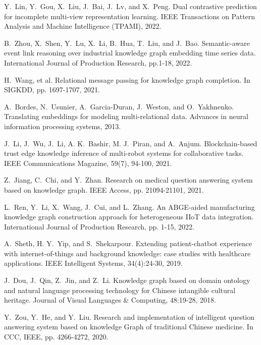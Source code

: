 \documentclass[11pt]{article}
\begin{document}
\begin{thebibliography}{10}
\begin{small}
 Y.~Lin, Y.~Gou, X.~Liu, J.~Bai, J.~Lv, and X.~Peng. \newblock Dual contrastive prediction for incomplete multi-view representation learning. \newblock IEEE Transactions on Pattern Analysis and Machine Intelligence (TPAMI), 2022.

 B.~Zhou, X.~Shen, Y.~Lu, X.~Li, B.~Hua, T.~Liu, and J.~Bao. \newblock  Semantic-aware event link reasoning over industrial knowledge graph embedding time series data. \newblock  International Journal of Production Research, pp.1-18, 2022.

 H.~Wang, et al. \newblock Relational message passing for knowledge graph completion. \newblock In SIGKDD, pp. 1697-1707, 2021.

 A.~Bordes, N.~Usunier, A.~Garcia-Duran, J.~Weston, and O.~Yakhnenko. \newblock Translating embeddings for modeling multi-relational data. \newblock Advances in neural information processing systems, 2013.

 J.~Li, J.~Wu, J.~Li, A. K.~Bashir, M. J.~Piran, and A.~Anjum. \newblock Blockchain-based trust edge knowledge inference of multi-robot systems for collaborative tasks. \newblock IEEE Communications Magazine, 59(7), 94-100, 2021.

 Z.~Jiang, C.~Chi, and Y.~Zhan. \newblock Research on medical question answering system based on knowledge graph. \newblock IEEE Access, pp. 21094-21101, 2021.

 L.~Ren, Y.~Li, X.~Wang, J.~Cui, and L.~Zhang. \newblock An ABGE-aided manufacturing knowledge graph construction approach for heterogeneous IIoT data integration. \newblock  International Journal of Production Research, pp. 1-15, 2022.

 A.~Sheth, H. Y.~Yip, and S.~Shekarpour. \newblock Extending patient-chatbot experience with internet-of-things and background knowledge: case studies with healthcare applications. \newblock IEEE Intelligent Systems, 34(4):24-30, 2019.

 J.~Dou, J.~Qin, Z.~Jin, and Z.~Li. \newblock  Knowledge graph based on domain ontology and natural language processing technology for Chinese intangible cultural heritage. \newblock Journal of Visual Languages \& Computing, 48:19-28, 2018.

 Y.~Zou, Y.~He, and Y.~Liu. \newblock Research and implementation of intelligent question answering system based on knowledge Graph of traditional Chinese medicine. \newblock In CCC, IEEE, pp. 4266-4272, 2020.


\end{small}
\end{thebibliography}
\end{document}
